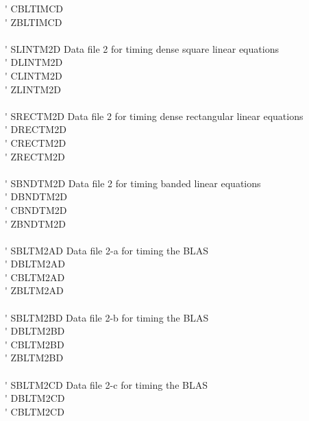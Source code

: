 \begin{tabbing}
 \> \titem \' \> CBLTIMCD \> \\
 \> \titem \' \> ZBLTIMCD \> \\
\vspace{0.1ex} \\
 \> \titem \' \> SLINTM2D\> Data file 2 for timing dense square linear equations \\
 \> \titem \' \> DLINTM2D \> \\
 \> \titem \' \> CLINTM2D \> \\
 \> \titem \' \> ZLINTM2D \> \\
\vspace{0.1ex} \\
 \> \titem \' \> SRECTM2D\> Data file 2 for timing dense rectangular linear equations \\
 \> \titem \' \> DRECTM2D \> \\
 \> \titem \' \> CRECTM2D \> \\
 \> \titem \' \> ZRECTM2D \> \\
\vspace{0.1ex} \\
 \> \titem \' \> SBNDTM2D\> Data file 2 for timing banded linear equations \\
 \> \titem \' \> DBNDTM2D \> \\
 \> \titem \' \> CBNDTM2D \> \\
 \> \titem \' \> ZBNDTM2D \> \\
\vspace{0.1ex} \\
 \> \titem \' \> SBLTM2AD\> Data file 2-a for timing the BLAS \\
 \> \titem \' \> DBLTM2AD \> \\
 \> \titem \' \> CBLTM2AD \> \\
 \> \titem \' \> ZBLTM2AD \> \\
\vspace{0.1ex} \\
 \> \titem \' \> SBLTM2BD\> Data file 2-b for timing the BLAS \\
 \> \titem \' \> DBLTM2BD \> \\
 \> \titem \' \> CBLTM2BD \> \\
 \> \titem \' \> ZBLTM2BD \> \\
\vspace{0.1ex} \\
 \> \titem \' \> SBLTM2CD\> Data file 2-c for timing the BLAS \\
 \> \titem \' \> DBLTM2CD \> \\
 \> \titem \' \> CBLTM2CD \> \\

\end{tabbing}
